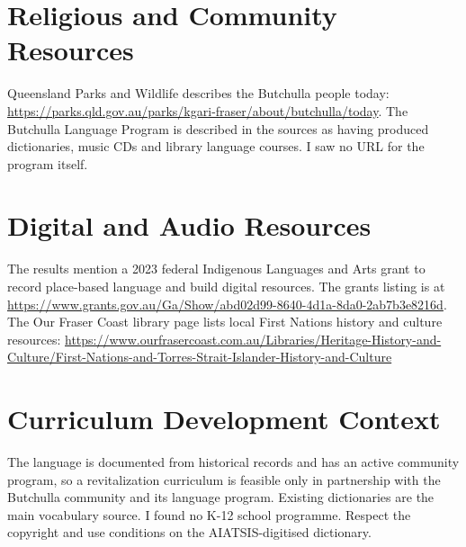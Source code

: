 \documentclass[12pt]{article}
\begin{document}
\section{Religious and Community Resources}
Queensland Parks and Wildlife describes the Butchulla people today: \url{https://parks.qld.gov.au/parks/kgari-fraser/about/butchulla/today}. The Butchulla Language Program is described in the sources as having produced dictionaries, music CDs and library language courses. I saw no URL for the program itself.

\section{Digital and Audio Resources}
The results mention a 2023 federal Indigenous Languages and Arts grant to record place-based language and build digital resources. The grants listing is at \url{https://www.grants.gov.au/Ga/Show/abd02d99-8640-4d1a-8da0-2ab7b3e8216d}. The Our Fraser Coast library page lists local First Nations history and culture resources: \url{https://www.ourfrasercoast.com.au/Libraries/Heritage-History-and-Culture/First-Nations-and-Torres-Strait-Islander-History-and-Culture}

\section{Curriculum Development Context}
The language is documented from historical records and has an active community program, so a revitalization curriculum is feasible only in partnership with the Butchulla community and its language program. Existing dictionaries are the main vocabulary source. I found no K-12 school programme. Respect the copyright and use conditions on the AIATSIS-digitised dictionary.
\end{document}
